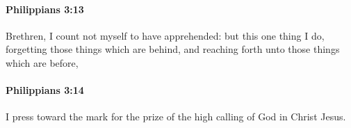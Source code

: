 		\paragraph{Philippians 3:13} %
			\label{PHILIPPIANS-3-13}

			Brethren, I count not myself to have apprehended: but this one thing I do, forgetting those things which are behind, and reaching forth unto those things which are before,

			\begin{framed}
			\scriptsize
				\begin{compactdesc}
					\item[SBLG] 
				\end{compactdesc}
			\end{framed}

		\paragraph{Philippians 3:14} %
			\label{PHILIPPIANS-3-14}

			I press toward the mark for the prize of the high calling of God in Christ Jesus.


